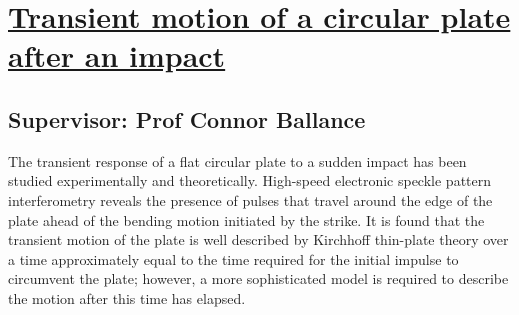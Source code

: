 \section{\href{http://dx.doi.org/10.1121/1.3049584}{Transient motion of a circular plate after an impact
}}

\subsection*{Supervisor: Prof Connor Ballance}

The transient response of a flat circular plate to a sudden impact has been studied experimentally and theoretically. High-speed electronic speckle pattern interferometry reveals the presence of pulses that travel around the edge of the plate ahead of the bending motion initiated by the strike. It is found that the transient motion of the plate is well described by Kirchhoff thin-plate theory over a time approximately equal to the time required for the initial impulse to circumvent the plate; however, a more sophisticated model is required to describe the motion after this time has elapsed.

